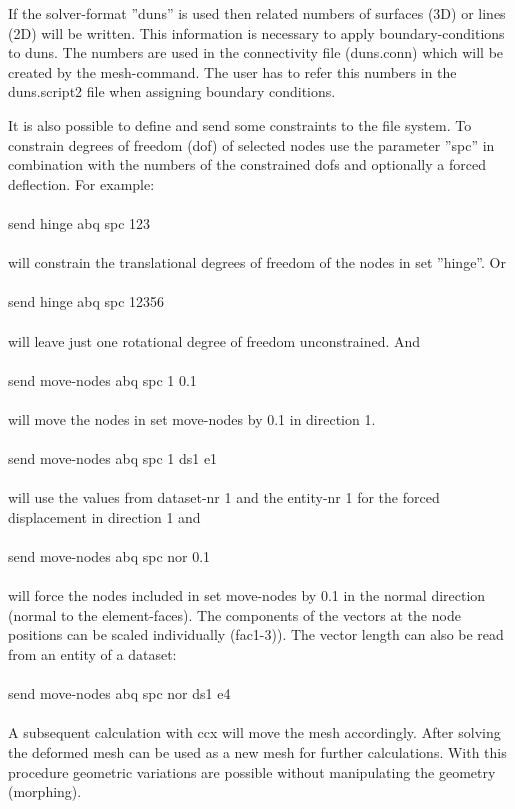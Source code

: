 \documentclass{article}
\begin{document}
If the solver-format ''duns'' is used then related numbers of surfaces (3D) or lines (2D) will be written. This information is necessary to apply boundary-conditions to duns. The numbers are used in the connectivity file (duns.conn) which will be created by the mesh-command. The user has to refer this numbers in the duns.script2 file when assigning boundary conditions.

It is also possible to define and send some constraints to the file system. To constrain degrees of freedom (dof) of selected nodes use the parameter ''spc'' in combination with the numbers of the constrained dofs and optionally a forced deflection. For example:\\\\send hinge abq spc 123\\\\will constrain the translational degrees of freedom of the nodes in set ''hinge''. Or\\\\send hinge abq spc 12356\\\\will leave just one rotational degree of freedom unconstrained. And\\\\send move-nodes abq spc 1 0.1\\\\will move the nodes in set move-nodes by 0.1 in direction 1.\\\\send move-nodes abq spc 1 ds1 e1\\\\will use the values from dataset-nr 1 and the entity-nr 1 for the forced displacement in direction 1 and\\\\send move-nodes abq spc nor 0.1\\\\ will force the nodes included in set move-nodes by 0.1 in the normal direction (normal to the element-faces). The components of the vectors at the node positions can be scaled individually (fac1-3)). The vector length can also be read from an entity of a dataset:\\\\send move-nodes abq spc nor ds1 e4\\\\ A subsequent calculation with ccx will move the mesh accordingly. After solving the deformed mesh can be used as a new mesh for further calculations. With this procedure geometric variations are possible without manipulating the geometry (morphing).
\end{document}
